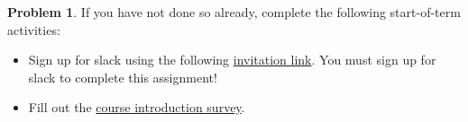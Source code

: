 \documentclass[12pt]{article}
\theoremstyle{definition}
\newtheorem{question}{Problem}
\begin{document}
\begin{question}
If you have not done so already, complete the following start-of-term activities:

\begin{itemize}
\item Sign up for slack using the following \href{https://join.slack.com/t/cs256-s21/shared_invite/zt-mbulx8tv-VMB1wVGH4i1Tbtzvh5amxA}{invitation link}. You must sign up for slack to complete this assignment!

\item Fill out the \href{https://docs.google.com/forms/d/e/1FAIpQLSe3odD5IftJxQYS4r9u_RVF_BZlUQdMsfccQcYtoVH8U2OBYg/viewform?usp=sf_link}{course introduction survey}.

\end{itemize}

\end{question}
\end{document}
